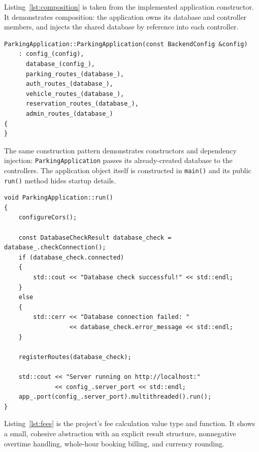 \documentclass[12pt,a4paper]{article}
\begin{document}
Listing~\ref{lst:composition} is taken from the implemented application
constructor. It demonstrates composition: the application owns its database
and controller members, and injects the shared database by reference into each
controller.

\begin{lstlisting}[caption={Implemented dependency wiring in ParkingApplication.},label={lst:composition}]
ParkingApplication::ParkingApplication(const BackendConfig &config)
    : config_(config),
      database_(config_),
      parking_routes_(database_),
      auth_routes_(database_),
      vehicle_routes_(database_),
      reservation_routes_(database_),
      admin_routes_(database_)
{
}
\end{lstlisting}

The same construction pattern demonstrates constructors and dependency
injection: \texttt{ParkingApplication} passes its already-created database to
the controllers. The application object itself is constructed in
\texttt{main()} and its public \texttt{run()} method hides startup details.

\begin{lstlisting}[caption={Application startup orchestration behind the run() abstraction.},label={lst:run-abstraction}]
void ParkingApplication::run()
{
    configureCors();

    const DatabaseCheckResult database_check = database_.checkConnection();
    if (database_check.connected)
    {
        std::cout << "Database check successful!" << std::endl;
    }
    else
    {
        std::cerr << "Database connection failed: "
                  << database_check.error_message << std::endl;
    }

    registerRoutes(database_check);

    std::cout << "Server running on http://localhost:"
              << config_.server_port << std::endl;
    app_.port(config_.server_port).multithreaded().run();
}
\end{lstlisting}

Listing~\ref{lst:fees} is the project's fee calculation value type and function.
It shows a small, cohesive abstraction with an explicit result structure,
nonnegative overtime handling, whole-hour booking billing, and currency
rounding.
\end{document}
